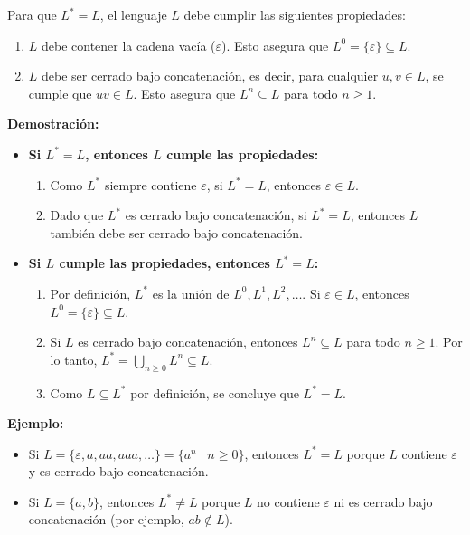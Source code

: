 \documentclass[12pt]{report} %
\begin{document}
\begin{solucion}

Para que \( L^* = L \), el lenguaje \( L \) debe cumplir las siguientes propiedades:

\begin{enumerate}
    \item \( L \) debe contener la cadena vacía (\( \varepsilon \)). Esto asegura que \( L^0 = \{\varepsilon\} \subseteq L \).
    \item \( L \) debe ser cerrado bajo concatenación, es decir, para cualquier \( u, v \in L \), se cumple que \( uv \in L \). Esto asegura que \( L^n \subseteq L \) para todo \( n \geq 1 \).
\end{enumerate}

\textbf{Demostración:}

\begin{itemize}
    \item \textbf{Si \( L^* = L \), entonces \( L \) cumple las propiedades:}
        \begin{enumerate}
            \item Como \( L^* \) siempre contiene \( \varepsilon \), si \( L^* = L \), entonces \( \varepsilon \in L \).
            \item Dado que \( L^* \) es cerrado bajo concatenación, si \( L^* = L \), entonces \( L \) también debe ser cerrado bajo concatenación.
        \end{enumerate}

    \item \textbf{Si \( L \) cumple las propiedades, entonces \( L^* = L \):}
        \begin{enumerate}
            \item Por definición, \( L^* \) es la unión de \( L^0, L^1, L^2, \dots \). Si \( \varepsilon \in L \), entonces \( L^0 = \{\varepsilon\} \subseteq L \).
            \item Si \( L \) es cerrado bajo concatenación, entonces \( L^n \subseteq L \) para todo \( n \geq 1 \). Por lo tanto, \( L^* = \bigcup_{n \geq 0} L^n \subseteq L \).
            \item Como \( L \subseteq L^* \) por definición, se concluye que \( L^* = L \).
        \end{enumerate}
\end{itemize}

\textbf{Ejemplo:}
\begin{itemize}
    \item Si \( L = \{\varepsilon, a, aa, aaa, \dots\} = \{a^n \mid n \geq 0\} \), entonces \( L^* = L \) porque \( L \) contiene \( \varepsilon \) y es cerrado bajo concatenación.
    \item Si \( L = \{a, b\} \), entonces \( L^* \neq L \) porque \( L \) no contiene \( \varepsilon \) ni es cerrado bajo concatenación (por ejemplo, \( ab \notin L \)).
\end{itemize}

\end{solucion}
\end{document}
